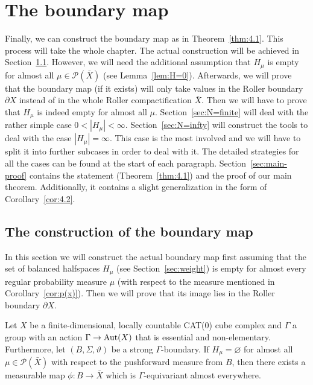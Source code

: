 \section{The boundary map}
\label{sec:map}

Finally, we can construct the boundary map as in Theorem~\ref{thm:4.1}. This process will take the whole chapter. The actual construction will be achieved in Section~\ref{sec:construction}. However, we will need the additional assumption that \(H_\mu\) is empty for almost all \(\mu \in \mathcal{P}(\bar X)\) (see Lemma~\ref{lem:H=0}). Afterwards, we will prove that the boundary map (if it exists) will only take values in the Roller boundary \(\partial X\) instead of in the whole Roller compactification \(\bar X\). Then we will have to prove that \(H_\mu\) is indeed empty for almost all \(\mu\). Section~\ref{sec:N=finite} will deal with the rather simple case \(0 < |H_\mu| < \infty\). Section~\ref{sec:N=infty} will construct the tools to deal with the case \(|H_\mu| = \infty\). This case is the most involved and we will have to split it into further subcases in order to deal with it. The detailed strategies for all the cases can be found at the start of each paragraph. Section~\ref{sec:main-proof} contains the statement (Theorem~\ref{thm:4.1}) and the proof of our main theorem. Additionally, it contains a slight generalization in the form of Corollary~\ref{cor:4.2}.

\subsection{The construction of the boundary map}
\label{sec:construction}
In this section we will construct the actual boundary map first assuming that the set of balanced halfspaces \(H_\mu\) (see Section~\ref{sec:weight}) is empty for almost every regular probability measure \(\mu\) (with respect to the measure mentioned in Corollary~\ref{cor:p(x)}). Then we will prove that its image lies in the Roller boundary \(\partial X\).

\begin{lemma}
  \label{lem:H=0}
  Let \(X\) be a finite-dimensional, locally countable CAT(0) cube complex and \(\Gamma\) a group with an action \(\Gamma \to \operatorname{Aut}(X)\) that is essential and non-elementary. Furthermore, let \((B,\Sigma,\vartheta)\) be a strong \(\Gamma\)-boundary. If \(H_\mu = \varnothing\) for almost all \(\mu \in \mathcal{P}(\bar X)\) with respect to the pushforward measure from \(B\), then there exists a measurable map \(\phi\colon B \to \bar X\) which is \(\Gamma\)-equivariant almost everywhere.
\end{lemma}

